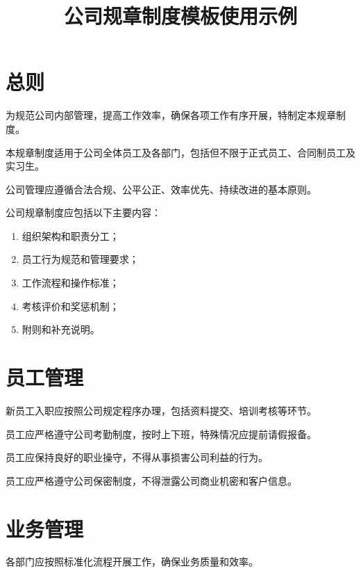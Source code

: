 \documentclass[large]{company-rule}
\title{公司规章制度模板使用示例}
\author{} %
\date{}   %
\begin{document}

\maketitle

\section{总则}

为规范公司内部管理，提高工作效率，确保各项工作有序开展，特制定本规章制度。

本规章制度适用于公司全体员工及各部门，包括但不限于正式员工、合同制员工及实习生。

公司管理应遵循合法合规、公平公正、效率优先、持续改进的基本原则。

公司规章制度应包括以下主要内容：
\begin{enumerate}
    \item 组织架构和职责分工；
    \item 员工行为规范和管理要求；
    \item 工作流程和操作标准；
    \item 考核评价和奖惩机制；
    \item 附则和补充说明。
\end{enumerate}

\section{员工管理}

新员工入职应按照公司规定程序办理，包括资料提交、培训考核等环节。

员工应严格遵守公司考勤制度，按时上下班，特殊情况应提前请假报备。

员工应保持良好的职业操守，不得从事损害公司利益的行为。

员工应严格遵守公司保密制度，不得泄露公司商业机密和客户信息。

\section{业务管理}

各部门应按照标准化流程开展工作，确保业务质量和效率。
\end{document}
